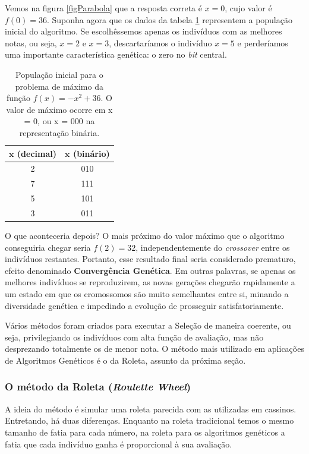 	 Vemos na figura \ref{figParabola} que a resposta correta é $x = 0$, cujo valor é $f(0) = 36$. Suponha agora que os dados da tabela \ref{tabFuncMax} representem a população inicial do algoritmo. Se escolhêssemos apenas os indivíduos com as melhores notas, ou seja, $x = 2$ e $x = 3$, descartaríamos o indivíduo $x = 5$ e perderíamos uma importante característica genética: o zero no \textit{bit} central.
	 
\begin{table}[htp]
		\caption{\label{tabFuncMax}População inicial para o problema de máximo da função $f(x) = -x^2 + 36$. O valor de máximo ocorre em x = 0, ou x = 000 na representação binária.}
		\begin{center}
			\begin{tabular}{c|c}
				\hline
				$\textbf{x}$ (decimal)		& $\textbf{x}$ (binário) \\
				\hline
				2							& 010 \\
				7							& 111 \\
				5							& 101 \\	
				3							& 011 \\
				\hline
			\end{tabular}
		\end{center}
	\end{table}
		
		O que aconteceria depois? O mais próximo do valor máximo que o algoritmo conseguiria chegar seria $f(2) = 32$, independentemente do \textit{crossover} entre os indivíduos restantes. Portanto, esse resultado final seria considerado prematuro, efeito denominado \textbf{Convergência Genética}. Em outras palavras, se apenas os melhores indivíduos se reproduzirem, as novas gerações chegarão rapidamente a um estado em que os cromossomos são muito semelhantes entre si, minando a diversidade genética e impedindo a evolução de prosseguir satisfatoriamente.
		
		Vários métodos foram criados para executar a Seleção de maneira coerente, ou seja, privilegiando os indivíduos com alta função de avaliação, mas não desprezando totalmente os de menor nota. O método mais utilizado em aplicações de Algoritmos Genéticos é o da Roleta, assunto da próxima seção.
	
	\subsubsection{O método da Roleta (\textit{Roulette Wheel})}
	
	A ideia do método é simular uma roleta parecida com as utilizadas em cassinos. Entretando, há duas diferenças. Enquanto na roleta tradicional temos o mesmo tamanho de fatia para cada número, na roleta para os algoritmos genéticos a fatia que cada indivíduo ganha é proporcional à sua avaliação.
	
